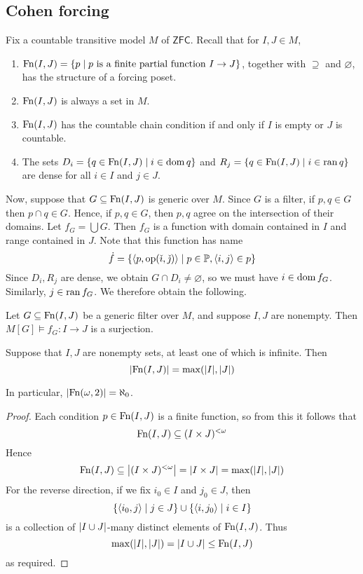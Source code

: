 \subsection{Cohen forcing}
Fix a countable transitive model \( M \) of \( \mathsf{ZFC} \).
Recall that for \( I, J \in M \),
\begin{enumerate}
    \item \( \operatorname{Fn}(I, J) = \qty{p \mid p \text{ is a finite partial function } I \to J} \), together with \( \supseteq \) and \( \varnothing \), has the structure of a forcing poset.
    \item \( \operatorname{Fn}(I, J) \) is always a set in \( M \).
    \item \( \operatorname{Fn}(I, J) \) has the countable chain condition if and only if \( I \) is empty or \( J \) is countable.
    \item The sets \( D_i = \qty{q \in \operatorname{Fn}(I, J) \mid i \in \operatorname{dom}q} \) and \( R_j = \qty{q \in \operatorname{Fn}(I, J) \mid i \in \operatorname{ran}q} \) are dense for all \( i \in I \) and \( j \in J \).
\end{enumerate}
Now, suppose that \( G \subseteq \operatorname{Fn}(I, J) \) is generic over \( M \).
Since \( G \) is a filter, if \( p, q \in G \) then \( p \cap q \in G \).
Hence, if \( p, q \in G \), then \( p, q \) agree on the intersection of their domains.
Let \( f_G = \bigcup G \).
Then \( f_G \) is a function with domain contained in \( I \) and range contained in \( J \).
Note that this function has name
\[ \dot f = \qty{\langle p, \operatorname{op}(\check \imath, \check \jmath) \rangle \mid p \in \mathbb P, \langle i, j \rangle \in p} \]
Since \( D_i, R_j \) are dense, we obtain \( G \cap D_i \neq \varnothing \), so we must have \( i \in \operatorname{dom} f_G \).
Similarly, \( j \in \operatorname{ran} f_G \).
We therefore obtain the following.
\begin{proposition}
    Let \( G \subseteq \operatorname{Fn}(I, J) \) be a generic filter over \( M \), and suppose \( I, J \) are nonempty.
    Then \( M[G] \vDash f_G : I \to J \) is a surjection.
\end{proposition}
\begin{proposition}
    Suppose that \( I, J \) are nonempty sets, at least one of which is infinite.
    Then
    \[ \abs{\operatorname{Fn}(I, J)} = \max(\abs{I}, \abs{J}) \]
\end{proposition}
In particular, \( \abs{\operatorname{Fn}(\omega, 2)} = \aleph_0 \).
\begin{proof}
    Each condition \( p \in \operatorname{Fn}(I, J) \) is a finite function, so from this it follows that
    \[ \operatorname{Fn}(I, J) \subseteq (I \times J)^{<\omega} \]
    Hence
    \[ \operatorname{Fn}(I, J) \subseteq \abs{(I \times J)^{<\omega}} = \abs{I \times J} = \max(\abs{I}, \abs{J}) \]
    For the reverse direction, if we fix \( i_0 \in I \) and \( j_0 \in J \), then
    \[ \qty{\langle i_0, j \rangle \mid j \in J} \cup \qty{\langle i, j_0 \rangle \mid i \in I} \]
    is a collection of \( \abs{I \cup J} \)-many distinct elements of \( \operatorname{Fn}(I, J) \).
    Thus
    \[ \max(\abs{I}, \abs{J}) = \abs{I \cup J} \leq \operatorname{Fn}(I, J) \]
    as required.
\end{proof}
